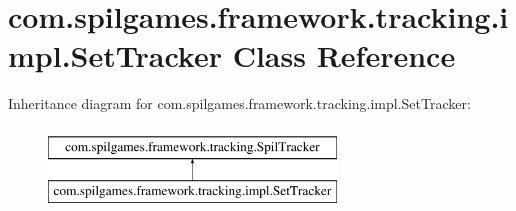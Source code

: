 \hypertarget{classcom_1_1spilgames_1_1framework_1_1tracking_1_1impl_1_1_set_tracker}{\section{com.\-spilgames.\-framework.\-tracking.\-impl.\-Set\-Tracker Class Reference}
\label{classcom_1_1spilgames_1_1framework_1_1tracking_1_1impl_1_1_set_tracker}
}
Inheritance diagram for com.\-spilgames.\-framework.\-tracking.\-impl.\-Set\-Tracker\-:\begin{figure}[H]
\begin{center}
\leavevmode
\includegraphics[height=2.000000cm]{classcom_1_1spilgames_1_1framework_1_1tracking_1_1impl_1_1_set_tracker}
\end{center}
\end{figure}
